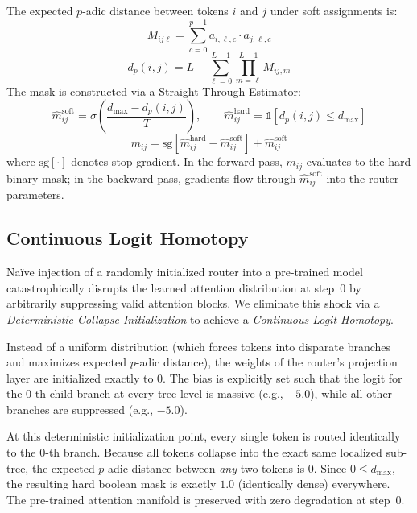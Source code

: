\documentclass[11pt,a4paper]{article}
\begin{document}
The expected $p$-adic distance between tokens $i$ and $j$ under soft assignments is:
\begin{equation}
    M_{ij\ell} = \sum_{c=0}^{p-1} a_{i,\ell,c} \cdot a_{j,\ell,c}
\end{equation}
\begin{equation}
    d_p(i,j) = L - \sum_{\ell=0}^{L-1} \prod_{m=\ell}^{L-1} M_{ij,m}
    \label{eq:distance}
\end{equation}
The mask is constructed via a Straight-Through Estimator:
\begin{equation}
    \hat{m}_{ij}^{\text{soft}} = \sigma\!\left(\frac{d_{\max} - d_p(i,j)}{T}\right), \qquad
    \hat{m}_{ij}^{\text{hard}} = \mathbb{1}\!\left[d_p(i,j) \leq d_{\max}\right]
\end{equation}
\begin{equation}
    m_{ij} = \text{sg}\!\left[\hat{m}_{ij}^{\text{hard}} - \hat{m}_{ij}^{\text{soft}}\right] + \hat{m}_{ij}^{\text{soft}}
    \label{eq:ste}
\end{equation}
where $\text{sg}[\cdot]$ denotes stop-gradient. In the forward pass, $m_{ij}$ evaluates to the hard binary mask; in the backward pass, gradients flow through $\hat{m}_{ij}^{\text{soft}}$ into the router parameters.

\subsection{Continuous Logit Homotopy}
\label{sec:homotopy}

Na\"ive injection of a randomly initialized router into a pre-trained model catastrophically disrupts the learned attention distribution at step~0 by arbitrarily suppressing valid attention blocks. We eliminate this shock via a \emph{Deterministic Collapse Initialization} to achieve a \emph{Continuous Logit Homotopy}.

Instead of a uniform distribution (which forces tokens into disparate branches and maximizes expected $p$-adic distance), the weights of the router's projection layer are initialized exactly to 0. The bias is explicitly set such that the logit for the 0-th child branch at every tree level is massive (e.g., $+5.0$), while all other branches are suppressed (e.g., $-5.0$).

At this deterministic initialization point, every single token is routed identically to the 0-th branch. Because all tokens collapse into the exact same localized sub-tree, the expected $p$-adic distance between \emph{any} two tokens is $0$. Since $0 \le d_{\max}$, the resulting hard boolean mask is exactly $1.0$ (identically dense) everywhere. The pre-trained attention manifold is preserved with zero degradation at step~0.
\end{document}
